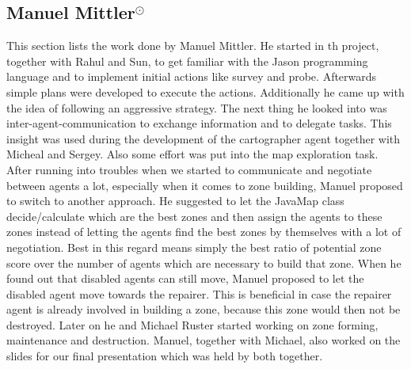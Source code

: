 \subsection[Manuel Mittler]{Manuel Mittler$^{\odot}$}
This section lists the work done by Manuel Mittler.
He started in th project, together with Rahul and Sun, to get familiar with the Jason programming language and to implement initial actions like survey and probe.
Afterwards simple plans were developed to execute the actions.
Additionally he came up with the idea of following an aggressive strategy.
The next thing he looked into was inter-agent-communication to exchange information and to delegate tasks.
This insight was used during the development of the cartographer agent together with Micheal and Sergey.
Also some effort was put into the map exploration task.
After running into troubles when we started to communicate and negotiate between agents a lot, especially when it comes to zone building, Manuel proposed to switch to another approach.
He suggested to let the JavaMap class decide/calculate which are the best zones and then assign the agents to these zones instead of letting the agents find the best zones by themselves with a lot of negotiation.
Best in this regard means simply the best ratio of potential zone score over the number of agents which are necessary to build that zone.
When he found out that disabled agents can still move, Manuel proposed to let the disabled agent move towards the repairer.
This is beneficial in case the repairer agent is already involved in building a zone, because this zone would then not be destroyed.
Later on he and Michael Ruster started working on zone forming, maintenance and destruction.
Manuel, together with Michael, also worked on the slides for our final presentation which was held by both together.
